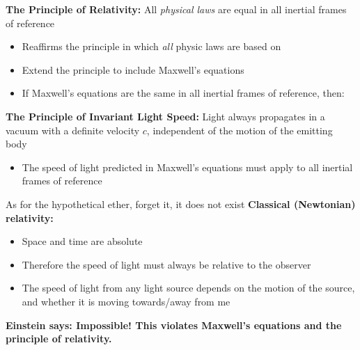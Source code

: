 \begin{definition}
  \textbf{The Principle of Relativity:} All \emph{physical laws} are
  equal in all inertial frames of reference
\end{definition}
\begin{itemize}
\item Reaffirms the principle in which \emph{all} physic laws are based on
\item Extend the principle to include Maxwell's equations
\item If Maxwell's equations are the same in all inertial frames of
  reference, then:
\end{itemize}
\begin{definition}
  \textbf{The Principle of Invariant Light Speed:} Light always
  propagates in a vacuum with a definite velocity $c$, independent of the
  motion of the emitting body
\end{definition}
\begin{itemize}
\item The speed of light predicted in Maxwell's equations must apply to all
  inertial frames of reference
\end{itemize}
As for the hypothetical ether, forget it, it does not exist
%
%
%
%
%
%
%
\textbf{Classical (Newtonian) relativity:}
\begin{itemize}
\item Space and time are absolute
\item Therefore the speed of light must always be relative to the observer
\item The speed of light from any light source depends on the motion of
  the source, and whether it is moving towards/away from me
\end{itemize}
\textbf{Einstein says: Impossible! This violates Maxwell's equations and
  the principle of relativity.}

